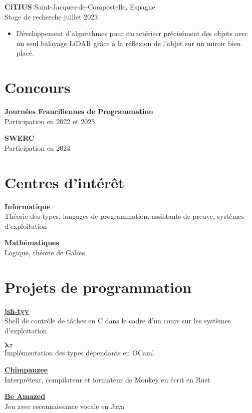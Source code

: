 \documentclass[12pt]{article}
\newcommand{\entry}[4]{{{\textbf{#1}}} \hfill #3 \\ #2 \hfill #4}
\begin{document}
\begin{paracol}{2}
	\entry{CiTIUS}{Stage de recherche}{Saint-Jacques-de-Compostelle, Espagne}{juillet 2023}
	\begin{itemize}[noitemsep,leftmargin=3.5mm,rightmargin=0mm,topsep=6pt]
		\item Développement d'algorithmes pour caractériser précisément des objets avec un seul balayage LiDAR grâce à la réflexion de l'objet sur un miroir bien placé.
	\end{itemize}


	\switchcolumn

	\section{Concours}


	\textbf{Journées Franciliennes de Programmation}\\
	\noindent Participation en 2022 et 2023

	\textbf{SWERC}\\
	\noindent Participation en 2024


\end{paracol}

\section{Centres d'intérêt}


\begin{paracol}{2}

	\entry{Informatique}{Théorie des types, langages de programmation, assistants de preuve, systèmes d'exploitation}{ }{ }

	\switchcolumn


	\entry{Mathématiques}{Logique, théorie de Galois}{ }{ }
\end{paracol}



\section{Projets de programmation}

\begin{paracol}{2}
	\entry{\href{https://github.com/Yag000/jsh-tyy}{jsh-tyy}}{Shell de contrôle de tâches en C dans le cadre d'un cours sur les systèmes d'exploitation}{ }{ }
	\medskip
	\switchcolumn

	\entry{\href{https://moule.informatique.univ-paris-diderot.fr/iglesias/U3bbU3c0}{$\pmb\lambda\pi$}}{Implémentation des types dépendants en OCaml}{ }{ }
	\medskip
	\switchcolumn

	\entry{\href{https://github.com/Yag000/chimpanzee}{Chimpanzee}}{Interpréteur, compilateur et formateur de Monkey en écrit en Rust}{ }{ }
	\switchcolumn

	\entry{\href{https://github.com/GabinDDL/L2S2-GYTMY-Game}{Be Amazed}}{Jeu avec reconnaissance vocale en Java}{ }{ }
\end{paracol}
\end{document}

